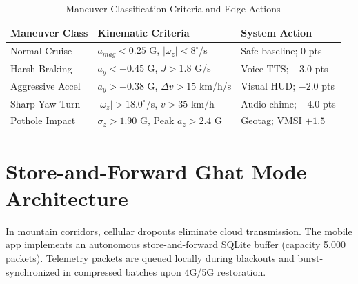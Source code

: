 \documentclass[conference]{IEEEtran}
\begin{document}
\begin{table}[htbp]
\caption{Maneuver Classification Criteria and Edge Actions}
\label{tab:maneuver}
\centering
\begin{tabular}{lll}
\toprule
\textbf{Maneuver Class} & \textbf{Kinematic Criteria} & \textbf{System Action} \\
\midrule
Normal Cruise & $a_{mag} < 0.25$ G, $|\omega_z| < 8^\circ$/s & Safe baseline; 0 pts \\
Harsh Braking & $a_y < -0.45$ G, $J > 1.8$ G/s & Voice TTS; $-3.0$ pts \\
Aggressive Accel & $a_y > +0.38$ G, $\Delta v > 15$ km/h/s & Visual HUD; $-2.0$ pts \\
Sharp Yaw Turn & $|\omega_z| > 18.0^\circ$/s, $v > 35$ km/h & Audio chime; $-4.0$ pts \\
Pothole Impact & $\sigma_z > 1.90$ G, Peak $a_z > 2.4$ G & Geotag; VMSI $+1.5$ \\
\bottomrule
\end{tabular}
\end{table}

\section{Store-and-Forward Ghat Mode Architecture}
In mountain corridors, cellular dropouts eliminate cloud transmission. The mobile app implements an autonomous store-and-forward SQLite buffer (capacity 5,000 packets). Telemetry packets are queued locally during blackouts and burst-synchronized in compressed batches upon 4G/5G restoration.
\end{document}
